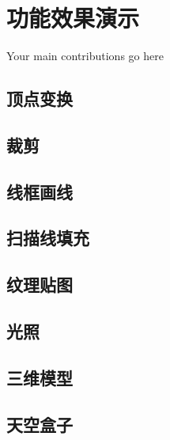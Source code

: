 

    \chapter{功能效果演示}

    Your main contributions go here

    \section{顶点变换}

    \section{裁剪}
    
    \section{线框画线}
    
    \section{扫描线填充}
    
    \section{纹理贴图}
    
    \section{光照}
    
    \section{三维模型}
    
    \section{天空盒子}


